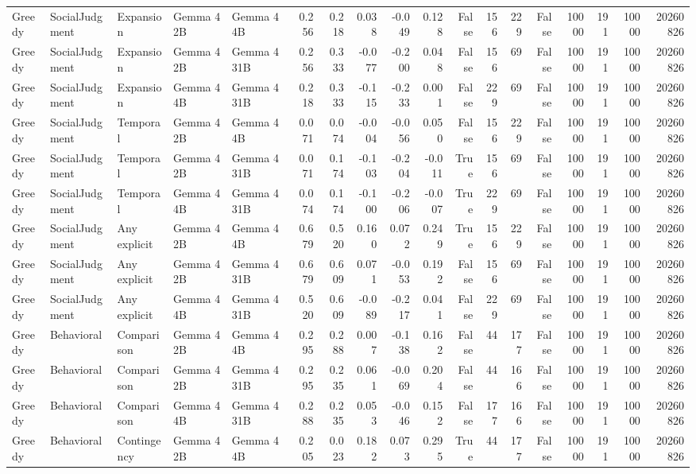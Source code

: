 \begin{tabular}{lllllrrrrrrrrrrrrr}
Greedy & SocialJudgment & Expansion & Gemma 4 2B & Gemma 4 4B & 0.256 & 0.218 & 0.038 & -0.049 & 0.128 & False & 156 & 229 & False & 10000 & 191 & 10000 & 20260826 \\
Greedy & SocialJudgment & Expansion & Gemma 4 2B & Gemma 4 31B & 0.256 & 0.333 & -0.077 & -0.200 & 0.048 & False & 156 & 69 & False & 10000 & 191 & 10000 & 20260826 \\
Greedy & SocialJudgment & Expansion & Gemma 4 4B & Gemma 4 31B & 0.218 & 0.333 & -0.115 & -0.233 & 0.001 & False & 229 & 69 & False & 10000 & 191 & 10000 & 20260826 \\
Greedy & SocialJudgment & Temporal & Gemma 4 2B & Gemma 4 4B & 0.071 & 0.074 & -0.004 & -0.056 & 0.050 & False & 156 & 229 & False & 10000 & 191 & 10000 & 20260826 \\
Greedy & SocialJudgment & Temporal & Gemma 4 2B & Gemma 4 31B & 0.071 & 0.174 & -0.103 & -0.204 & -0.011 & True & 156 & 69 & False & 10000 & 191 & 10000 & 20260826 \\
Greedy & SocialJudgment & Temporal & Gemma 4 4B & Gemma 4 31B & 0.074 & 0.174 & -0.100 & -0.206 & -0.007 & True & 229 & 69 & False & 10000 & 191 & 10000 & 20260826 \\
Greedy & SocialJudgment & Any explicit & Gemma 4 2B & Gemma 4 4B & 0.679 & 0.520 & 0.160 & 0.072 & 0.249 & True & 156 & 229 & False & 10000 & 191 & 10000 & 20260826 \\
Greedy & SocialJudgment & Any explicit & Gemma 4 2B & Gemma 4 31B & 0.679 & 0.609 & 0.071 & -0.053 & 0.192 & False & 156 & 69 & False & 10000 & 191 & 10000 & 20260826 \\
Greedy & SocialJudgment & Any explicit & Gemma 4 4B & Gemma 4 31B & 0.520 & 0.609 & -0.089 & -0.217 & 0.041 & False & 229 & 69 & False & 10000 & 191 & 10000 & 20260826 \\
Greedy & Behavioral & Comparison & Gemma 4 2B & Gemma 4 4B & 0.295 & 0.288 & 0.007 & -0.138 & 0.162 & False & 44 & 177 & False & 10000 & 191 & 10000 & 20260826 \\
Greedy & Behavioral & Comparison & Gemma 4 2B & Gemma 4 31B & 0.295 & 0.235 & 0.061 & -0.069 & 0.204 & False & 44 & 166 & False & 10000 & 191 & 10000 & 20260826 \\
Greedy & Behavioral & Comparison & Gemma 4 4B & Gemma 4 31B & 0.288 & 0.235 & 0.053 & -0.046 & 0.152 & False & 177 & 166 & False & 10000 & 191 & 10000 & 20260826 \\
Greedy & Behavioral & Contingency & Gemma 4 2B & Gemma 4 4B & 0.205 & 0.023 & 0.182 & 0.073 & 0.295 & True & 44 & 177 & False & 10000 & 191 & 10000 & 20260826 \\

\end{tabular}
